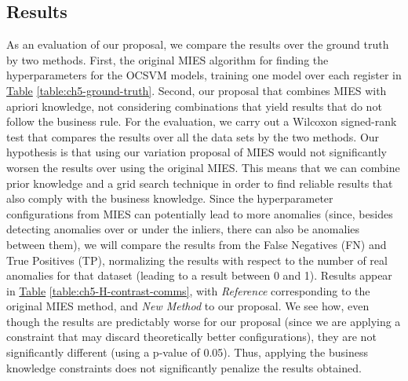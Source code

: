 \subsection{Results}\label{subsec:ch5-ResultsComms}
As an evaluation of our proposal, we compare the results over the ground truth by two methods. First, the original MIES algorithm for finding the hyperparameters for the OCSVM models, training one model over each register in \hyperref[table:ch5-ground-truth]{Table} \ref{table:ch5-ground-truth}. Second, our proposal that combines MIES with apriori knowledge, not considering combinations that yield results that do not follow the business rule. 
For the evaluation, we carry out a Wilcoxon signed-rank test \parencite{conover1998practical} that compares the results over all the data sets by the two methods. Our hypothesis is that using our variation proposal of MIES would not significantly worsen the results over using the original MIES. This means that we can combine prior knowledge and a grid search technique in order to find reliable results that also comply with the business knowledge.
Since the hyperparameter configurations from MIES can potentially lead to more anomalies (since, besides detecting anomalies over or under the inliers, there can also be anomalies between them), we will compare the results from the False Negatives (FN) and True Positives (TP), normalizing the results with respect to the number of real anomalies for that dataset (leading to a result between 0 and 1).
Results appear in \hyperref[table:ch5-H-contrast-comms]{Table} \ref{table:ch5-H-contrast-comms}, with \textit{Reference} corresponding to the original MIES method, and \textit{New Method} to our proposal. We see how, even though the results are predictably worse for our proposal (since we are applying a constraint that may discard theoretically better configurations), they are not significantly different (using a p-value of 0.05). Thus, applying the business knowledge constraints does not significantly penalize the results obtained.

\begin{table}[h!]
\centering
{}
\caption{Hypothesis contrast comparing TP and FN among the different grid search methods}
\label{table:ch5-H-contrast-comms}
\end{table}

